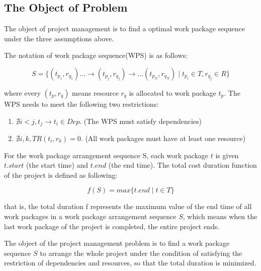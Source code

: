\subsection{The Object of Problem}
%
The object of project management is to find a optimal work package sequence
under the three assumptions above.

The notation of work package sequence(WPS) is as follows:

\begin{equation}
  S = \{
  (t_{p_1}, r_{q_1}) ... \rightarrow (t_{p_j}, r_{q_j}) \rightarrow ... (t_{p_N}, r_{q_N})
  \mid t_{p_i} \in T, r_{q_j} \in R
  \}
  \label{wps}
\end{equation}

where every $(t_p, r_q)$ means resource $r_q$ is allocated to work package $t_p$.
The WPS needs to meet the following two restrictions:

\begin{enumerate}
\item $\nexists i < j, t_j \rightarrow t_i \in Dep$.
  (The WPS must satisfy dependencies)
\item $\nexists i, k, TR(t_i, r_k) = 0$.
  (All work packages must have at least one resource)
\end{enumerate}

For the work package arrangement sequence S, each work package $t$ is
given $t.start$ (the start time) and $t.end$ (the end time).  The
total cost duration function of the project is defined as following:

\begin{equation}
f(S) = max\{t.end \mid t \in T\}
\end{equation}

that is, the total duration f represents the maximum value of the end
time of all work packages in a work package arrangement sequence $S$,
which means when the last work package of the project is completed,
the entire project ends.

The object of the project management problem is to find a work
package sequence $S$ to arrange the whole project under the condition
of satisfying the restriction of dependencies and resources, so that
the total duration is minimized.


